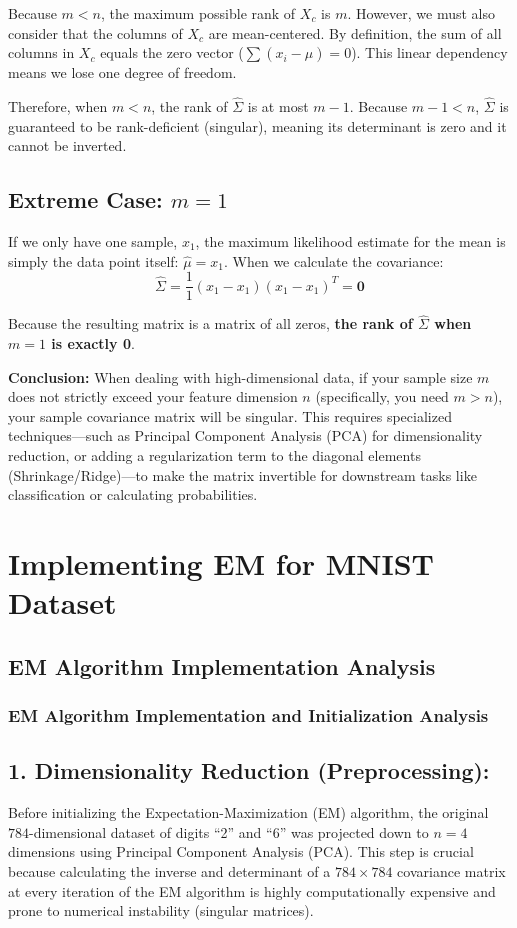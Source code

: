 \documentclass[twoside, 10pt]{article}
\begin{document}
Because $m < n$, the maximum possible rank of $X_c$ is $m$. However, we must also consider that the columns of $X_c$ are mean-centered. By definition, the sum of all columns in $X_c$ equals the zero vector ($\sum(x_i - \hat{\mu}) = 0$). This linear dependency means we lose one degree of freedom.

Therefore, when $m < n$, the rank of $\hat{\Sigma}$ is at most $m - 1$. Because $m - 1 < n$, $\hat{\Sigma}$ is guaranteed to be rank-deficient (singular), meaning its determinant is zero and it cannot be inverted.

\subsection*{Extreme Case: $m = 1$}
If we only have one sample, $x_1$, the maximum likelihood estimate for the mean is simply the data point itself: $\hat{\mu} = x_1$. When we calculate the covariance:
\[\hat{\Sigma} = \frac{1}{1} (x_1 - x_1)(x_1 - x_1)^T = \mathbf{0}\]

Because the resulting matrix is a matrix of all zeros, \textbf{the rank of $\hat{\Sigma}$ when $m = 1$ is exactly 0}.

\textbf{Conclusion:} When dealing with high-dimensional data, if your sample size $m$ does not strictly exceed your feature dimension $n$ (specifically, you need $m > n$), your sample covariance matrix will be singular. This requires specialized techniques—such as Principal Component Analysis (PCA) for dimensionality reduction, or adding a regularization term to the diagonal elements (Shrinkage/Ridge)—to make the matrix invertible for downstream tasks like classification or calculating probabilities.

\section{Implementing EM for MNIST Dataset} %
\subsection{EM Algorithm Implementation Analysis}
\subsubsection{EM Algorithm Implementation and Initialization Analysis}
\subsection*{1. Dimensionality Reduction (Preprocessing):}
Before initializing the Expectation-Maximization (EM) algorithm, the original $784$-dimensional dataset of digits ``2'' and ``6'' was projected down to $n=4$ dimensions using Principal Component Analysis (PCA). This step is crucial because calculating the inverse and determinant of a $784 \times 784$ covariance matrix at every iteration of the EM algorithm is highly computationally expensive and prone to numerical instability (singular matrices).
\end{document}
